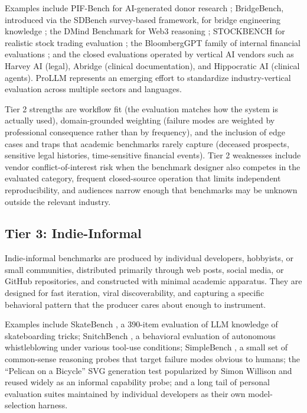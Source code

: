 \documentclass[11pt,a4paper]{article}
\begin{document}
Examples include PIF-Bench for AI-generated donor research \citep{lijo2026pifbench}; BridgeBench, introduced via the SDBench survey-based framework, for bridge engineering knowledge \citep{sdbench2025}; the DMind Benchmark for Web3 reasoning \citep{dmind2025}; STOCKBENCH for realistic stock trading evaluation \citep{stockbench2025}; the BloombergGPT family of internal financial evaluations \citep{wu2023bloomberggpt}; and the closed evaluations operated by vertical AI vendors such as Harvey AI (legal), Abridge (clinical documentation), and Hippocratic AI (clinical agents). ProLLM \citep{prollm2025} represents an emerging effort to standardize industry-vertical evaluation across multiple sectors and languages.

Tier 2 strengths are workflow fit (the evaluation matches how the system is actually used), domain-grounded weighting (failure modes are weighted by professional consequence rather than by frequency), and the inclusion of edge cases and traps that academic benchmarks rarely capture (deceased prospects, sensitive legal histories, time-sensitive financial events). Tier 2 weaknesses include vendor conflict-of-interest risk when the benchmark designer also competes in the evaluated category, frequent closed-source operation that limits independent reproducibility, and audiences narrow enough that benchmarks may be unknown outside the relevant industry.

\subsection{Tier 3: Indie-Informal}
\label{sec:tier3}

Indie-informal benchmarks are produced by individual developers, hobbyists, or small communities, distributed primarily through web posts, social media, or GitHub repositories, and constructed with minimal academic apparatus. They are designed for fast iteration, viral discoverability, and capturing a specific behavioral pattern that the producer cares about enough to instrument.

Examples include SkateBench \citep{browne2025skatebench}, a 390-item evaluation of LLM knowledge of skateboarding tricks; SnitchBench \citep{browne2025snitchbench}, a behavioral evaluation of autonomous whistleblowing under various tool-use conditions; SimpleBench \citep{simplebench2024}, a small set of common-sense reasoning probes that target failure modes obvious to humans; the ``Pelican on a Bicycle'' SVG generation test popularized by Simon Willison and reused widely as an informal capability probe; and a long tail of personal evaluation suites maintained by individual developers as their own model-selection harness.
\end{document}
